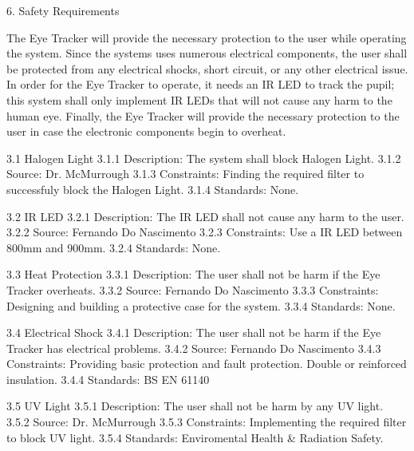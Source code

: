 6. Safety Requirements

The Eye Tracker will provide the necessary protection to the user while operating the system. Since the systems uses numerous electrical components, the user shall be protected from any electrical shocks, short circuit, or any other electrical issue. In order for the Eye Tracker to operate, it needs an IR LED to track the pupil; this system shall only implement IR LEDs that will not cause any harm to the human eye. Finally, the Eye Tracker will provide the necessary protection to the user in case the electronic components begin to overheat.

3.1 Halogen Light
	3.1.1 Description: The system shall block Halogen Light.
	3.1.2 Source: Dr. McMurrough
	3.1.3 Constraints: Finding the required filter to successfuly block the Halogen Light.
	3.1.4 Standards: None.
	
3.2 IR LED
	3.2.1 Description: The IR LED shall not cause any harm to the user.
	3.2.2 Source: Fernando Do Nascimento
	3.2.3 Constraints: Use a IR LED between 800mm and 900mm.
	3.2.4 Standards: None.
	
3.3 Heat Protection
	3.3.1 Description: The user shall not be harm if the Eye Tracker overheats.
	3.3.2 Source: Fernando Do Nascimento
	3.3.3 Constraints: Designing and building a protective case for the system.
	3.3.4 Standards: None.
	
3.4 Electrical Shock
	3.4.1 Description: The user shall not be harm if the Eye Tracker has electrical problems.
	3.4.2 Source: Fernando Do Nascimento
	3.4.3 Constraints: Providing basic protection and fault protection. Double or reinforced insulation.
	3.4.4 Standards: BS EN 61140
	
3.5 UV Light
	3.5.1 Description: The user shall not be harm by any UV light.
	3.5.2 Source: Dr. McMurrough
	3.5.3 Constraints: Implementing the required filter to block UV light.
	3.5.4 Standards: Enviromental Health & Radiation Safety.
